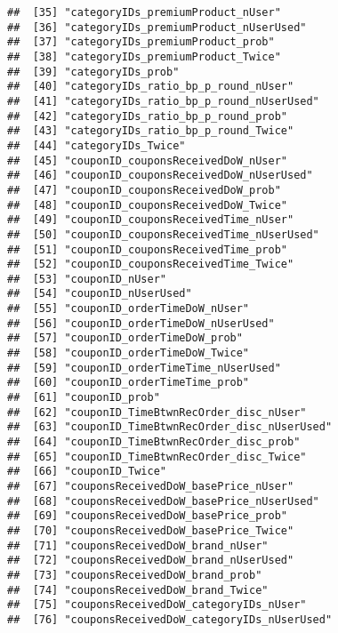 \documentclass[10pt]{report}
\begin{document}
\begin{verbatim}
##  [35] "categoryIDs_premiumProduct_nUser"                   
##  [36] "categoryIDs_premiumProduct_nUserUsed"               
##  [37] "categoryIDs_premiumProduct_prob"                    
##  [38] "categoryIDs_premiumProduct_Twice"                   
##  [39] "categoryIDs_prob"                                   
##  [40] "categoryIDs_ratio_bp_p_round_nUser"                 
##  [41] "categoryIDs_ratio_bp_p_round_nUserUsed"             
##  [42] "categoryIDs_ratio_bp_p_round_prob"                  
##  [43] "categoryIDs_ratio_bp_p_round_Twice"                 
##  [44] "categoryIDs_Twice"                                  
##  [45] "couponID_couponsReceivedDoW_nUser"                  
##  [46] "couponID_couponsReceivedDoW_nUserUsed"              
##  [47] "couponID_couponsReceivedDoW_prob"                   
##  [48] "couponID_couponsReceivedDoW_Twice"                  
##  [49] "couponID_couponsReceivedTime_nUser"                 
##  [50] "couponID_couponsReceivedTime_nUserUsed"             
##  [51] "couponID_couponsReceivedTime_prob"                  
##  [52] "couponID_couponsReceivedTime_Twice"                 
##  [53] "couponID_nUser"                                     
##  [54] "couponID_nUserUsed"                                 
##  [55] "couponID_orderTimeDoW_nUser"                        
##  [56] "couponID_orderTimeDoW_nUserUsed"                    
##  [57] "couponID_orderTimeDoW_prob"                         
##  [58] "couponID_orderTimeDoW_Twice"                        
##  [59] "couponID_orderTimeTime_nUserUsed"                   
##  [60] "couponID_orderTimeTime_prob"                        
##  [61] "couponID_prob"                                      
##  [62] "couponID_TimeBtwnRecOrder_disc_nUser"               
##  [63] "couponID_TimeBtwnRecOrder_disc_nUserUsed"           
##  [64] "couponID_TimeBtwnRecOrder_disc_prob"                
##  [65] "couponID_TimeBtwnRecOrder_disc_Twice"               
##  [66] "couponID_Twice"                                     
##  [67] "couponsReceivedDoW_basePrice_nUser"                 
##  [68] "couponsReceivedDoW_basePrice_nUserUsed"             
##  [69] "couponsReceivedDoW_basePrice_prob"                  
##  [70] "couponsReceivedDoW_basePrice_Twice"                 
##  [71] "couponsReceivedDoW_brand_nUser"                     
##  [72] "couponsReceivedDoW_brand_nUserUsed"                 
##  [73] "couponsReceivedDoW_brand_prob"                      
##  [74] "couponsReceivedDoW_brand_Twice"                     
##  [75] "couponsReceivedDoW_categoryIDs_nUser"               
##  [76] "couponsReceivedDoW_categoryIDs_nUserUsed"           

\end{verbatim}
\end{document}
